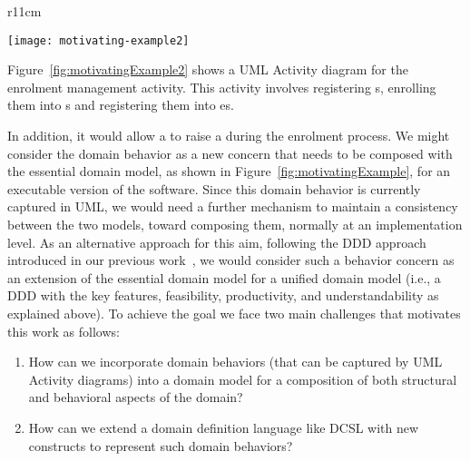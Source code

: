 {\makeatletter
	\let\par\@@par
	\par{}
	\everypar{}
\begin{wrapfigure}{r}{11cm}
	\begin{center}
\vspace{-0.8cm}		\texttt{[image: motivating-example2]}
	\end{center}
\vspace{-0.5cm}
	\caption{A UML Activity diagram to represent the enrolment management activity.}
	\label{fig:motivatingExample2}
\end{wrapfigure}
%
Figure~\ref{fig:motivatingExample2} shows a UML Activity diagram for the enrolment management activity. This activity involves registering s, enrolling them into s and registering them into es.%
\par}%
\noindent In addition, it would allow a  to raise a  during the enrolment process. %
%
We might consider the domain behavior as a new concern that needs to be composed with the essential domain model, as shown in Figure~\ref{fig:motivatingExample}, for an executable version of the software. Since this domain behavior is currently captured in UML, we would need a further mechanism to maintain a consistency between the two models, toward composing them, normally at an implementation level. As an alternative approach for this aim, following the DDD approach introduced in our previous work~\cite{le_domain_2018}, we would consider such a behavior concern as an extension of the essential domain model for a unified domain model (i.e., a DDD with the key features, feasibility, productivity, and understandability as explained above). To achieve the goal we face two main challenges that motivates this work as follows:

\begin{enumerate}
    \item How can we incorporate domain behaviors (that can be captured by UML Activity diagrams) into a domain model for a composition of both structural and behavioral aspects of the domain?
    \item How can we extend a domain definition language like DCSL with new constructs to represent such domain behaviors?    
\end{enumerate}